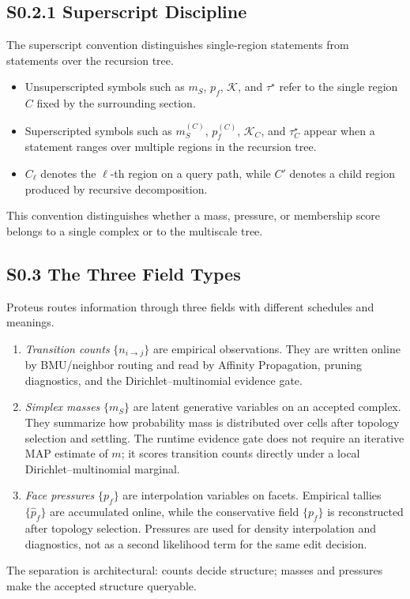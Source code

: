 \documentclass[11pt]{article}
\begin{document}
\subsection*{S0.2.1 Superscript Discipline}
The superscript convention distinguishes single-region statements from statements over the recursion tree.
\begin{itemize}[leftmargin=1.5em]
  \item Unsuperscripted symbols such as $m_S$, $p_f$, $\mathcal K$, and $\tau^\star$ refer to the single region $C$ fixed by the surrounding section.
  \item Superscripted symbols such as $m_S^{(C)}$, $p_f^{(C)}$, $\mathcal K_C$, and $\tau_C^\star$ appear when a statement ranges over multiple regions in the recursion tree.
  \item $C_\ell$ denotes the $\ell$-th region on a query path, while $C'$ denotes a child region produced by recursive decomposition.
\end{itemize}
This convention distinguishes whether a mass, pressure, or membership score belongs to a single complex or to the multiscale tree.

\subsection*{S0.3 The Three Field Types}
Proteus routes information through three fields with different schedules and meanings.
\begin{enumerate}[leftmargin=1.5em]
  \item \emph{Transition counts} $\{n_{i\to j}\}$ are empirical observations. They are written online by BMU/neighbor routing and read by Affinity Propagation, pruning diagnostics, and the Dirichlet--multinomial evidence gate.
  \item \emph{Simplex masses} $\{m_S\}$ are latent generative variables on an accepted complex. They summarize how probability mass is distributed over cells after topology selection and settling. The runtime evidence gate does not require an iterative MAP estimate of $m$; it scores transition counts directly under a local Dirichlet--multinomial marginal.
  \item \emph{Face pressures} $\{p_f\}$ are interpolation variables on facets. Empirical tallies $\{\hat p_f\}$ are accumulated online, while the conservative field $\{p_f\}$ is reconstructed after topology selection. Pressures are used for density interpolation and diagnostics, not as a second likelihood term for the same edit decision.
\end{enumerate}
The separation is architectural: counts decide structure; masses and pressures make the accepted structure queryable.
\end{document}
